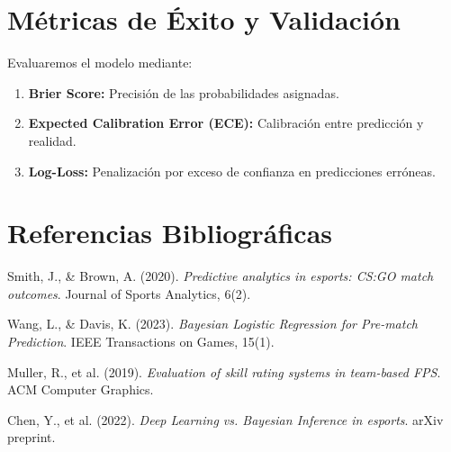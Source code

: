 \documentclass[12pt,a4paper]{article}
\begin{document}
\section{Métricas de Éxito y Validación}

Evaluaremos el modelo mediante:
\begin{enumerate}
    \item \textbf{Brier Score:} Precisión de las probabilidades asignadas.
    \item \textbf{Expected Calibration Error (ECE):} Calibración entre predicción y realidad.
    \item \textbf{Log-Loss:} Penalización por exceso de confianza en predicciones erróneas.
\end{enumerate}

\section{Referencias Bibliográficas}

\begin{enumerate}[label={[\arabic*]}]
    \item Smith, J., \& Brown, A. (2020). \textit{Predictive analytics in esports: CS:GO match outcomes}. Journal of Sports Analytics, 6(2).
    \item Wang, L., \& Davis, K. (2023). \textit{Bayesian Logistic Regression for Pre-match Prediction}. IEEE Transactions on Games, 15(1).
    \item Muller, R., et al. (2019). \textit{Evaluation of skill rating systems in team-based FPS}. ACM Computer Graphics.
    \item Chen, Y., et al. (2022). \textit{Deep Learning vs. Bayesian Inference in esports}. arXiv preprint.
\end{enumerate}
\end{document}
